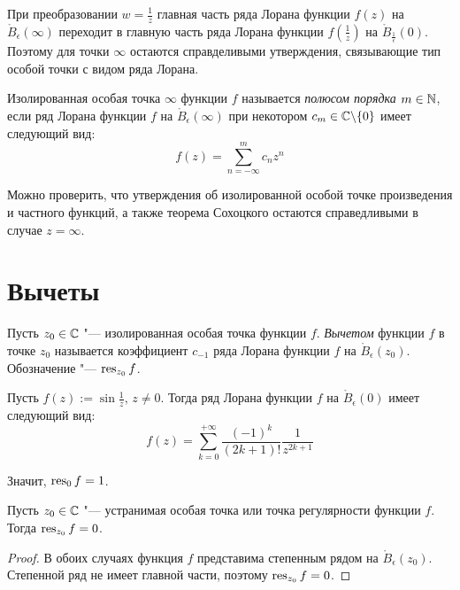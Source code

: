 \begin{note}
	При преобразовании $w = \frac1z$ главная часть ряда Лорана функции $f(z)$ на $\mathring B_\epsilon(\infty)$ переходит в главную часть ряда Лорана функции $f(\frac1z)$ на $\mathring B_\frac1\epsilon(0)$. Поэтому для точки $\infty$ остаются справделивыми утверждения, связывающие тип особой точки с видом ряда Лорана.
\end{note}

\begin{definition}
	Изолированная особая точка $\infty$ функции $f$ называется \textit{полюсом порядка $m \in \mathbb{N}$}, если ряд Лорана функции $f$ на $\mathring B_\epsilon(\infty)$ при некотором $c_{m} \in \mathbb{C} \backslash \{0\}$ имеет следующий вид:
	\[f(z) = \sum_{n = -\infty}^{m}c_nz^n\]
\end{definition}

\begin{note}
	Можно проверить, что утверждения об изолированной особой точке произведения и частного функций, а также теорема Сохоцкого остаются справедливыми в случае $z = \infty$.
\end{note}

\section{Вычеты}

\begin{definition}
	Пусть $z_0 \in \mathbb{C}$ "--- изолированная особая точка функции $f$. \textit{Вычетом} функции $f$ в точке $z_0$ называется коэффициент $c_{-1}$ ряда Лорана функции $f$ на $\mathring B_\epsilon(z_0)$. Обозначение "--- $\operatorname*{res}_{z_0}f$.
\end{definition}

\begin{example}
	Пусть $f(z) := \sin{\frac 1z}$, $z \ne 0$. Тогда ряд Лорана функции $f$ на $\mathring B_\epsilon(0)$ имеет следующий вид:
	\[f(z) = \sum_{k = 0}^{+\infty}\frac{(-1)^k}{(2k+1)!}\frac1{z^{2k+1}}\]
	
	Значит, $\operatorname*{res}_0{f} = 1$.
\end{example}

\begin{proposition}
	Пусть $z_0 \in \mathbb{C}$ "--- устранимая особая точка или точка регулярности функции $f$. Тогда $\operatorname*{res}_{z_0}f = 0$.
\end{proposition}

\begin{proof}
	В обоих случаях функция $f$ представима степенным рядом на $\mathring B_\epsilon(z_0)$. Степенной ряд не имеет главной части, поэтому $\operatorname*{res}_{z_0}f = 0$.
\end{proof}

